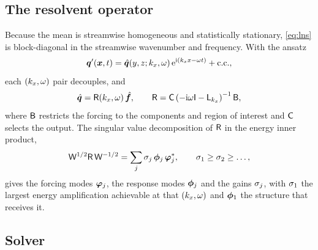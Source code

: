 \subsection{The resolvent operator}
\label{sec:resolvent:operator}

Because the mean is streamwise homogeneous and statistically stationary,
\cref{eq:lns} is block-diagonal in the streamwise wavenumber and frequency. With
the ansatz
\begin{equation}
  \bm{q}'(\bm{x},t)
    = \hat{\bm{q}}(y,z;k_{x},\omega)\,\mathrm{e}^{\mathrm{i}(k_{x} x - \omega t)} + \mathrm{c.c.} ,
  \label{eq:ansatz}
\end{equation}
each $(k_{x},\omega)$ pair decouples, and
\begin{equation}
  \hat{\bm{q}} = \mathsf{R}(k_{x},\omega)\,\hat{\bm{f}} ,
  \qquad
  \mathsf{R} = \mathsf{C}\left(-\mathrm{i}\omega\mathsf{I} - \mathsf{L}_{k_{x}}\right)^{-1}\mathsf{B} ,
  \label{eq:resolvent}
\end{equation}
where $\mathsf{B}$ restricts the forcing to the components and region of interest and
$\mathsf{C}$ selects the output. The singular value decomposition of $\mathsf{R}$ in the
energy inner product,
\begin{equation}
  \mathsf{W}^{1/2}\mathsf{R}\,\mathsf{W}^{-1/2}
    = \sum_{j} \sigma_j \, \bm{\phi}_j \, \bm{\varphi}_j^{*} ,
  \qquad \sigma_1 \ge \sigma_2 \ge \dots ,
  \label{eq:svd}
\end{equation}
gives the forcing modes $\bm{\varphi}_j$, the response modes $\bm{\phi}_j$ and the gains
$\sigma_j$, with $\sigma_1$ the largest energy amplification achievable at that
$(k_{x},\omega)$ and $\bm{\phi}_1$ the structure that receives it.



\subsection{Solver}
\label{sec:resolvent:solver}

